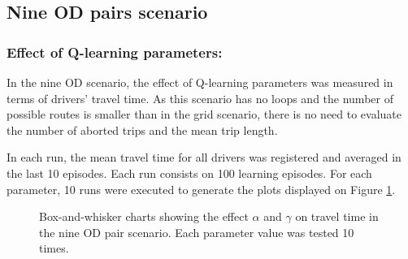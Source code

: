 \documentclass{RITA}
\begin{document}
\subsection{Nine OD pairs scenario}

\subsubsection{Effect of Q-learning parameters:}
\label{sec:qlParamsNineOD}
In the nine OD scenario, the effect of Q-learning parameters was measured in terms of drivers' travel time. As this scenario has no loops and the number of possible routes is smaller than in the grid scenario, there is no need to evaluate the number of aborted trips and the mean trip length.

In each run, the mean travel time for all drivers was registered and averaged in the last 10 episodes. Each run consists on 100 learning episodes. For each parameter, 10 runs were executed to generate the plots displayed on Figure \ref{fig:qLearningParams}.

\begin{figure}[ht]
  \centering
  \caption{Box-and-whisker charts showing the effect $\alpha$ and $\gamma$ on travel time in the nine OD pair scenario. Each parameter value was tested 10 times.}
  \label{fig:qLearningParams}
\end{figure}
\end{document}
